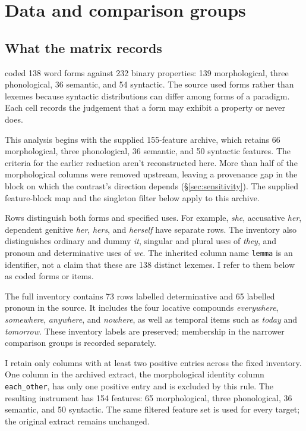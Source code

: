 \documentclass[12pt]{article}
\providecommand{\mention}[1]{\textit{#1}}
\begin{document}
\section{Data and comparison groups}
\label{sec:data}

\subsection{What the matrix records}

\textcite[\S2.2]{reynolds2021} coded 138 word forms against 232 binary properties: 139 morphological, three phonological, 36 semantic, and 54 syntactic. The source used forms rather than lexemes because syntactic distributions can differ among forms of a paradigm. Each cell records the judgement that a form may exhibit a property or never does.

This analysis begins with the supplied 155-feature archive, which retains 66 morphological, three phonological, 36 semantic, and 50 syntactic features. The criteria for the earlier reduction aren't reconstructed here. More than half of the morphological columns were removed upstream, leaving a provenance gap in the block on which the contrast's direction depends (\S\ref{sec:sensitivity}). The supplied feature-block map and the singleton filter below apply to this archive.

Rows distinguish both forms and specified uses. For example, \mention{she}, accusative \mention{her}, dependent genitive \mention{her}, \mention{hers}, and \mention{herself} have separate rows. The inventory also distinguishes ordinary and dummy \mention{it}, singular and plural uses of \mention{they}, and pronoun and determinative uses of \mention{we}. The inherited column name \texttt{lemma} is an identifier, not a claim that these are 138 distinct lexemes. I refer to them below as coded forms or items.

The full inventory contains 73 rows labelled determinative and 65 labelled pronoun in the source. It includes the four locative compounds \mention{everywhere}, \mention{somewhere}, \mention{anywhere}, and \mention{nowhere}, as well as temporal items such as \mention{today} and \mention{tomorrow}. These inventory labels are preserved; membership in the narrower comparison groups is recorded separately.

I retain only columns with at least two positive entries across the fixed inventory. One column in the archived extract, the morphological identity column \texttt{each\_other}, has only one positive entry and is excluded by this rule. The resulting instrument has 154 features: 65 morphological, three phonological, 36 semantic, and 50 syntactic. The same filtered feature set is used for every target; the original extract remains unchanged.
\end{document}
